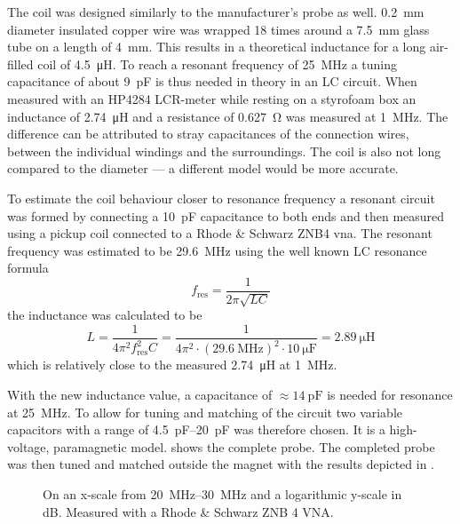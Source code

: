 The coil was designed similarly to the manufacturer's probe as well. \qty{0.2}{\milli\metre} diameter insulated copper wire was wrapped 18 times around a \qty{7.5}{\milli\metre} glass tube on a length of \qty{4}{\milli\metre}. This results in a theoretical inductance for a long air-filled coil of \qty{4.5}{\micro\henry}. To reach a resonant frequency of \qty{25}{\mega\hertz} a tuning capacitance of about \qty{9}{\pico\farad} is thus needed in theory in an LC circuit. When measured with an HP4284 LCR-meter while resting on a styrofoam box an inductance of \qty{2.74}{\micro\henry} and a resistance of \qty{0.627}{\ohm} was measured at \qty{1}{\mega\hertz}. The difference can be attributed to stray capacitances of the connection wires, between the individual windings and the surroundings. The coil is also not long compared to the diameter --- a different model would be more accurate.

To estimate the coil behaviour closer to resonance frequency a resonant circuit was formed by connecting a \qty{10}{\pico\farad} capacitance to both ends and then measured using a pickup coil connected to a Rhode \& Schwarz ZNB4 \acrshort{vna}. The resonant frequency was estimated to be \qty{29.6}{\mega\hertz} using the well known LC resonance formula
\[
    f_{\text{res}} = \frac{1}{2\pi{}\sqrt{LC}}
\]
the inductance was calculated to be
\[
    L = \frac{1}{4\pi{}^2f_{\text{res}}^2C} = \frac{1}{4\pi{}^2 \cdot{} (\qty{29.6}{\mega\hertz})^2 \cdot{} \qty{10}{\micro\farad}} = \qty{2.89}{\micro\henry}
\] which is relatively close to the measured \qty{2.74}{\micro\henry} at \qty{1}{\mega\hertz}.

With the new inductance value, a capacitance of \(\approx{}\qty{14}{\pico\farad}\) is needed for resonance at \qty{25}{\mega\hertz}. To allow for tuning and matching of the circuit two variable capacitors with a range of \qtyrange{4.5}{20}{\pico\farad} was therefore chosen. It is a high-voltage, paramagnetic model.  shows the complete probe. The completed probe was then tuned and matched outside the magnet with the results depicted in .

\begin{figure}[hbt]
    \centering
    
    \caption{ On an x-scale from \qtyrange{20}{30}{\mega\hertz} and a logarithmic y-scale in \unit{\deci\bel}. Measured with a Rhode \& Schwarz ZNB 4 VNA.}
\end{figure}


